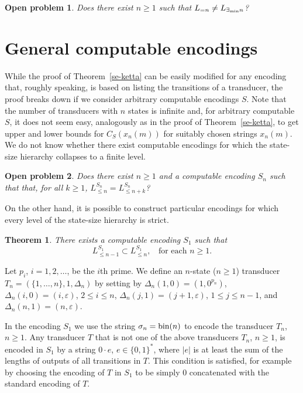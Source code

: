 \documentclass[copyright]{eptcs}
\def \proof{\bigbreak\noindent{\bf Proof.\ \ }}
\newtheorem{theorem}{T\/heorem}[section]
\newtheorem{open}{Open problem}
\begin{document}
\begin{open}
\label{se-ketta4}
Does there exist $n \geq 1$ such that
$L_{=n} \neq L_{\exists_{\rm min} n}$?
\end{open}

\section{General computable encodings}
\label{sec-viisi}

While the proof of Theorem~\ref{se-ketta} can be easily modified
for any encoding that, roughly speaking, is based on listing
the transitions of a transducer, the proof breaks down if we consider
arbitrary computable encodings $S$.
Note that the number of transducers with $n$ states is infinite
and, for arbitrary computable $S$, it does not seem easy, 
analogously as in the proof of Theorem~\ref{se-ketta}, to get
upper and lower bounds for $C_S(x_n(m))$ for suitably chosen
strings $x_n(m)$.
We do not know whether there exist computable encodings
for which the state-size hierarchy collapses to a finite level.

\begin{open}
\label{se-tatta}
Does there exist $n \geq 1$ and a computable encoding $S_n$ such that
that, for all $k \geq 1$, $L^{S_n}_{\leq n} = L^{S_n}_{\leq n + k}$?
\end{open}

On the other hand, it is possible to construct particular
encodings 
for which every level of the state-size hierarchy 
is strict.

\begin{theorem}
\label{se-tatta2}
There exists a computable encoding
$S_{1}$ such that
$$
L^{S_{1}}_{ \leq n-1} \subset L^{S_{1}}_{ \leq n}, \;\; \mbox{ for each }
n \geq 1.
$$
\end{theorem}
\proof
Let $p_i$, $i = 1, 2, \ldots$, be the $i$th prime.
We define
an $n$-state ($n \geq 1$) transducer
$T_n = (\{1, \ldots, n \}, 1, \Delta_n)$ by setting
by $\Delta_n(1, 0) = (1, 0^{p_n})$, $\Delta_n(i, 0) = (i, \varepsilon)$,
$2 \leq i \leq n$, $\Delta_n(j, 1) = (j+1, \varepsilon)$,
$1 \leq j \leq n-1$, and $\Delta_n(n, 1) = (n, \varepsilon)$.

In the encoding $S_1$ we use the string $\sigma_n = {\rm bin}(n)$ to encode
the transducer $T_n$, $n \geq 1$.
Any transducer $T$ that is not one of the
above transducers $T_n$, $n \geq 1$, is encoded in
$S_1$ by a string $0 \cdot e$, $e \in \{ 0, 1 \}^*$, where $|e|$
is at least the  sum of the lengths of outputs
of all transitions in $T$. This condition is satisfied, for example
by choosing the encoding of $T$ in $S_1$ to be simply 0 concatenated
with the
standard encoding of $T$.
\end{document}
